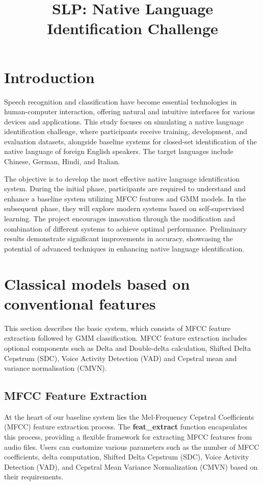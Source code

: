 \documentclass{Interspeech2024}
\title{SLP: Native Language Identification Challenge}
\begin{document}
\maketitle
  
\section{Introduction}

Speech recognition and classification have become essential technologies in
human-computer interaction, offering natural and intuitive interfaces for
various devices and applications. This study focuses on simulating a native
language identification challenge, where participants receive training,
development, and evaluation datasets, alongside baseline systems for closed-set
identification of the native language of foreign English speakers. The target
languages include Chinese, German, Hindi, and Italian.

The objective is to develop the most effective native language identification
system. During the initial phase, participants are required to understand and
enhance a baseline system utilizing MFCC features and GMM models. In the
subsequent phase, they will explore modern systems based on self-supervised
learning. The project encourages innovation through the modification and
combination of different systems to achieve optimal performance. Preliminary
results demonstrate significant improvements in accuracy, showcasing the
potential of advanced techniques in enhancing native language identification.

\section{Classical models based on conventional features}

This section describes the basic system, which consists of MFCC feature
extraction followed by GMM classification. MFCC feature extraction includes
optional components such as Delta and Double-delta calculation, Shifted Delta
Cepstrum (SDC), Voice Activity Detection (VAD) and Cepstral mean and variance
normalisation (CMVN). 

\subsection{MFCC Feature Extraction}

At the heart of our baseline system lies the Mel-Frequency Cepstral
Coefficients (MFCC) feature extraction process. The \textbf{feat\_extract}
function encapsulates this process, providing a flexible framework for
extracting MFCC features from audio files. Users can customize various
parameters such as the number of MFCC coefficients, delta computation, Shifted
Delta Cepstrum (SDC), Voice Activity Detection (VAD), and Cepstral Mean
Variance Normalization (CMVN) based on their requirements.
\end{document}

